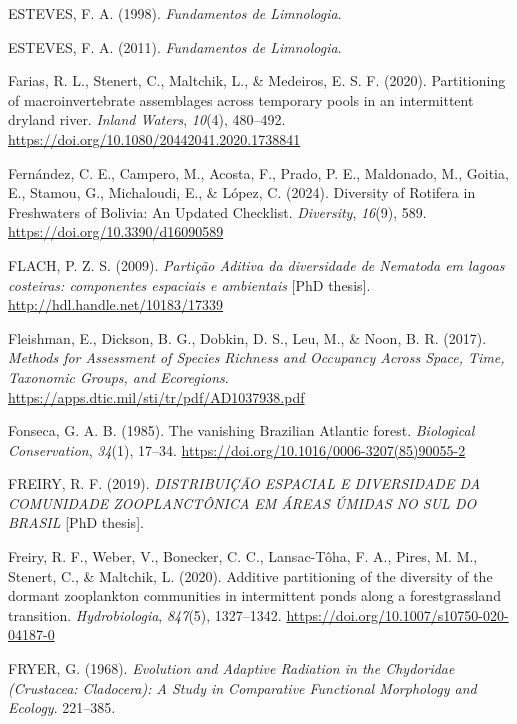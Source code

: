 \documentclass[
  letterpaper,
  DIV=11,
  numbers=noendperiod]{scrartcl}
\newlength{\cslhangindent}
\newenvironment{CSLReferences}[2] %
 {\begin{list}{}{%
  \setlength{\itemindent}{0pt}
  \setlength{\leftmargin}{0pt}
  \setlength{\parsep}{0pt}
  \ifodd #1
   \setlength{\leftmargin}{\cslhangindent}
   \setlength{\itemindent}{-1\cslhangindent}
  \fi
  \setlength{\itemsep}{#2\baselineskip}}}
 {\end{list}}
\begin{document}
\begin{CSLReferences}{1}{0}
ESTEVES, F. A. (1998). \emph{Fundamentos de Limnologia}.

ESTEVES, F. A. (2011). \emph{Fundamentos de Limnologia}.

Farias, R. L., Stenert, C., Maltchik, L., \& Medeiros, E. S. F. (2020).
Partitioning of macroinvertebrate assemblages across temporary pools in
an intermittent dryland river. \emph{Inland Waters}, \emph{10}(4),
480--492. \url{https://doi.org/10.1080/20442041.2020.1738841}

Fernández, C. E., Campero, M., Acosta, F., Prado, P. E., Maldonado, M.,
Goitia, E., Stamou, G., Michaloudi, E., \& López, C. (2024). Diversity
of Rotifera in Freshwaters of Bolivia: An Updated Checklist.
\emph{Diversity}, \emph{16}(9), 589.
\url{https://doi.org/10.3390/d16090589}

FLACH, P. Z. S. (2009). \emph{Partição Aditiva da diversidade de
Nematoda em lagoas costeiras: componentes espaciais e ambientais} {[}PhD
thesis{]}. \url{http://hdl.handle.net/10183/17339}

Fleishman, E., Dickson, B. G., Dobkin, D. S., Leu, M., \& Noon, B. R.
(2017). \emph{Methods for Assessment of Species Richness and Occupancy
Across Space, Time, Taxonomic Groups, and Ecoregions}.
\url{https://apps.dtic.mil/sti/tr/pdf/AD1037938.pdf}

Fonseca, G. A. B. (1985). The vanishing Brazilian Atlantic forest.
\emph{Biological Conservation}, \emph{34}(1), 17--34.
\url{https://doi.org/10.1016/0006-3207(85)90055-2}

FREIRY, R. F. (2019). \emph{DISTRIBUIÇÃO ESPACIAL E DIVERSIDADE DA
COMUNIDADE ZOOPLANCTÔNICA EM ÁREAS ÚMIDAS NO SUL DO BRASIL} {[}PhD
thesis{]}.

Freiry, R. F., Weber, V., Bonecker, C. C., Lansac-Tôha, F. A., Pires, M.
M., Stenert, C., \& Maltchik, L. (2020). Additive partitioning of the
diversity of the dormant zooplankton communities in intermittent ponds
along a forest{\textendash}grassland transition. \emph{Hydrobiologia},
\emph{847}(5), 1327--1342.
\url{https://doi.org/10.1007/s10750-020-04187-0}

FRYER, G. (1968). \emph{Evolution and Adaptive Radiation in the
Chydoridae (Crustacea: Cladocera): A Study in Comparative Functional
Morphology and Ecology}. 221--385.


\end{CSLReferences}
\end{document}
